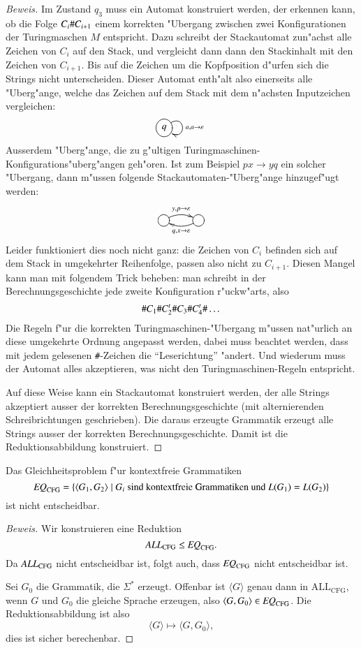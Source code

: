 \begin{proof}[Beweis]
Im Zustand $q_3$ muss ein Automat konstruiert werden, der erkennen kann,
ob die Folge $C_i{\tt\#}C_{i+1}$ einem korrekten "Ubergang zwischen
zwei Konfigurationen der Turingmaschen $M$ entspricht.
Dazu schreibt
der Stackautomat zun"achst alle Zeichen von $C_i$ auf den
Stack, und vergleicht dann dann den Stackinhalt mit den Zeichen von
$C_{i+1}$.
Bis auf die Zeichen um die Kopfposition d"urfen sich
die Strings nicht unterscheiden.
Dieser Automat enth"alt also
einerseits alle "Uberg"ange, welche das Zeichen auf dem Stack
mit dem n"achsten Inputzeichen vergleichen:
\[
\entrymodifiers={++[o][F]}
\xymatrix{
q\ar@(ur,dr)^{a,a\to\varepsilon}
}
\]
Ausserdem "Uberg"ange, die zu g"ultigen
Turingmaschinen-Konfigurations"uberg"angen geh"oren.
Ist zum Beispiel
$px\to yq$ ein solcher "Ubergang, dann m"ussen folgende
Stackautomaten-"Uberg"ange hinzugef"ugt werden:
\[
\entrymodifiers={++[o][F]}
\xymatrix{
{}\ar@/^/[r]^{y,p\to\varepsilon}
	&\ar@/^/[l]^{q,x\to\varepsilon}
}
\]
Leider funktioniert dies noch nicht ganz: die Zeichen von $C_i$
befinden sich auf dem Stack in umgekehrter Reihenfolge, passen
also nicht zu $C_{i+1}$.
Diesen Mangel kann man mit folgendem
Trick beheben: man schreibt in der Berechnungsgeschichte jede
zweite Konfiguration r"uckw"arts, also
\[
{\tt\#}C_1{\tt\#}C_2^t{\tt\#}C_3{\tt\#}C_4^t{\tt\#}\dots
\]
Die Regeln f"ur die korrekten Turingmaschinen-"Ubergang m"ussen
nat"urlich an diese umgekehrte Ordnung angepasst werden, dabei
muss beachtet werden, dass mit jedem gelesenen {\tt\#}-Zeichen
die ``Leserichtung'' "andert.
Und wiederum muss der Automat alles
akzeptieren, was nicht den Turingmaschinen-Regeln entspricht.

Auf diese Weise kann ein Stackautomat konstruiert werden, der
alle Strings akzeptiert ausser der korrekten Berechnungsgeschichte
(mit alternierenden Schreibrichtungen geschrieben).
Die daraus
erzeugte Grammatik erzeugt alle Strings ausser der
korrekten Berechnungsgeschichte.
Damit ist die Reduktionsabbildung
konstruiert.
\end{proof}

\begin{satz}
%
Das Gleichheitsproblem f"ur kontextfreie Grammatiken
\[
\text{\it EQ}_{\text{CFG}}=\{
\langle G_1,G_2\rangle\;|\;\text{$G_i$ sind kontextfreie Grammatiken
und $L(G_1)=L(G_2)$}
\}
\]
%
ist nicht entscheidbar.
\end{satz}

\begin{proof}[Beweis]
Wir konstruieren eine Reduktion
\[
\text{\it ALL}_{\text{CFG}}
\le
\text{\it EQ}_{\text{CFG}}.
\]
Da $\text{\it ALL}_{\text{CFG}}$ nicht entscheidbar ist, folgt
auch, dass $\text{\it EQ}_{\text{CFG}}$ nicht entscheidbar
ist.

Sei $G_0$ die Grammatik, die $\Sigma^*$ erzeugt.
Offenbar ist
$\langle G\rangle$ genau dann in $\text{ALL}_{\text{CFG}}$,
wenn $G$ und $G_0$ die gleiche Sprache erzeugen, also
$\langle G,G_0\rangle\in\text{\it EQ}_{\text{CFG}}$.
Die Reduktionsabbildung ist also
\[
\langle G\rangle \mapsto \langle G,G_0\rangle,
\]
dies ist sicher berechenbar.
\end{proof}


